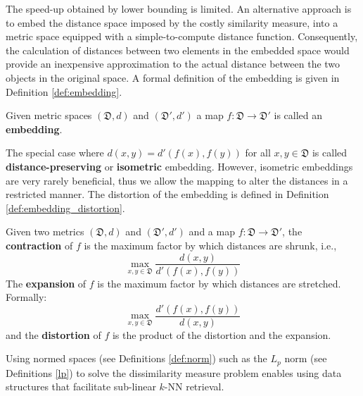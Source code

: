 \iftoggle{edit-mode}{\hspace{0pt}\marginpar{A different approach}}{}
The speed-up obtained by lower bounding is limited. 
An alternative approach is to embed the distance space imposed by the costly similarity measure, into a metric space equipped with a simple-to-compute distance function. 
Consequently, the calculation of distances between two elements in the embedded space would provide an inexpensive approximation to the actual distance between the two objects in the original space. 
A formal definition of the embedding is given in Definition \ref{def:embedding}.

\begin{definition}
Given metric spaces $(\mathfrak{D}, d)$ and $(\mathfrak{D}', d')$ a map $f : \mathfrak{D} \rightarrow \mathfrak{D}'$ is called an \textbf{embedding}.
\label{def:embedding}
\end{definition}

\iftoggle{edit-mode}{\hspace{0pt}\marginpar{Isometric embedding}}{}
The special case where $d(x, y) = d'(f(x), f(y))$ for all $x, y \in \mathfrak{D}$ is called \textbf{distance-preserving} or \textbf{isometric} embedding. However, isometric embeddings are very rarely beneficial, thus we allow the mapping to alter the distances in a restricted manner. The distortion of the embedding is defined in Definition \ref{def:embedding_distortion}.

\begin{definition}
Given two metrics $(\mathfrak{D}, d)$ and $(\mathfrak{D}',d')$ and a map $f : \mathfrak{D} \rightarrow \mathfrak{D}'$, the \textbf{contraction} of $f$ is the maximum factor by which distances are shrunk, i.e.,
\begin{equation}
\max_{x,y \in \mathfrak{D}} \frac{d(x,y)}{d'(f(x),f(y))}
\end{equation}
The \textbf{expansion} of $f$ is the maximum factor by which distances are stretched. Formally:
\begin{equation}
\max_{x,y \in \mathfrak{D}} \frac{d'(f(x),f(y))}{d(x,y)}
\end{equation}
and the \textbf{distortion} of $f$ is the product of the distortion and the expansion.
\label{def:embedding_distortion}
\end{definition}

\iftoggle{edit-mode}{\hspace{0pt}\marginpar{$L_p$ advantage and drawbacks}}{}
Using normed spaces (see Definitions \ref{def:norm}) such as the $L_p$ norm (see Definitions \ref{lp}) to solve the dissimilarity measure problem enables using data structures that facilitate sub-linear $k$-NN retrieval.

